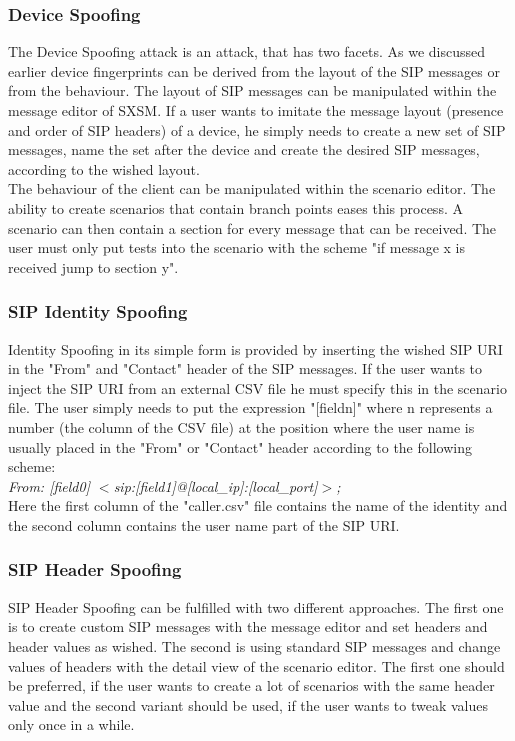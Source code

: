 \documentclass[final
	]{issa}
\begin{document}
\subsubsection{Device Spoofing}
The Device Spoofing attack is an attack, that has two facets. As we discussed earlier device fingerprints can be derived from the layout of the SIP messages or from the behaviour. The layout of SIP messages can be manipulated within the message editor of SXSM. If a user wants to imitate the message layout (presence and order of SIP headers) of a device, he simply needs to create a new set of SIP messages, name the set after the device and create the desired SIP messages, according to the wished layout.\\
The behaviour of the client can be manipulated within the scenario editor. The ability to create scenarios that contain branch points eases this process. A scenario can then contain a section for every message that can be received. The user must only put tests into the scenario with the scheme "if message x is received jump to section y".
\subsubsection{SIP Identity Spoofing}
Identity Spoofing in its simple form is provided by inserting the wished SIP URI in the "From" and "Contact" header of the SIP messages. If the user wants to inject the SIP URI from an external CSV file he must specify this in the scenario file. The user simply needs to put the expression "[fieldn]" where n represents a number (the column of the CSV file) at the position where the user name is usually placed in the "From" or "Contact" header according to the following scheme:\\
\textit{From: [field0] $<$sip:[field1]@[local\_ip]:[local\_port]$>$;}\\
Here the first column of the "caller.csv" file contains the name of the identity and the second column contains the user name part of the SIP URI.
\subsubsection{SIP Header Spoofing}
SIP Header Spoofing can be fulfilled with two different approaches. The first one is to create custom SIP messages with the message editor and set headers and header values as wished. The second is using standard SIP messages and change values of headers with the detail view of the scenario editor. The first one should be preferred, if the user wants to create a lot of scenarios with the same header value and the second variant should be used, if the user wants to tweak values only once in a while.
\end{document}
